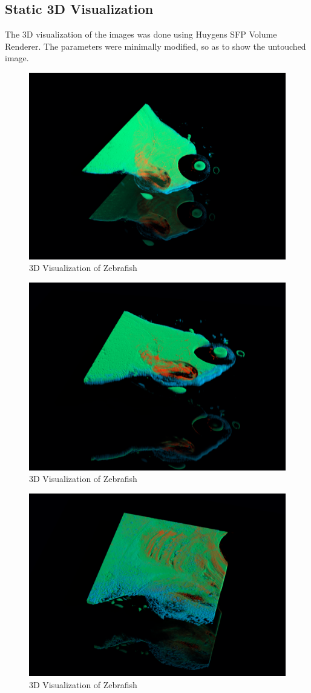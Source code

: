 \documentclass{article}
\begin{document}
\subsection*{Static 3D Visualization}
The 3D visualization of the images was done using Huygens SFP Volume Renderer. The parameters were minimally modified, so as to show the untouched image. 
\begin{figure}[h!]
    \centering
    \includegraphics[width=0.75\linewidth]{Report/Images/6.4-9/Image_0.png}
    \caption{3D Visualization of Zebrafish}
    \label{fig:zebrafish_0}
\end{figure}
\begin{figure}[h!]
    \centering
    \includegraphics[width=0.75\linewidth]{Report/Images/6.4-9/image_1.png}
    \caption{3D Visualization of Zebrafish}
    \label{fig:zebrafish_1}
\end{figure}
\begin{figure}[h!]
    \centering
    \includegraphics[width=0.75\linewidth]{Report/Images/6.4-9/image_2.png}
    \caption{3D Visualization of Zebrafish}
    \label{fig:zebrafish_2}
\end{figure}
\end{document}
